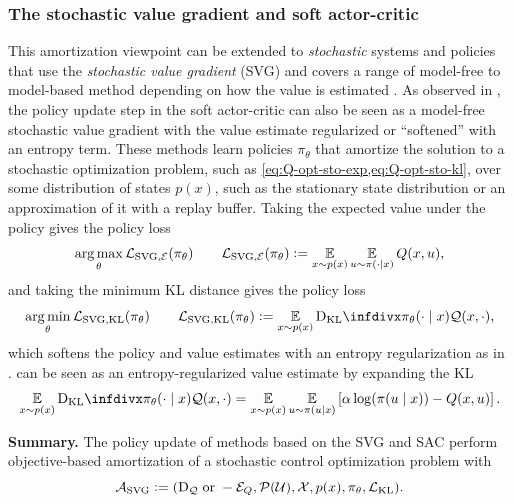 \documentclass[twoside,11pt]{article}
\begin{document}
\subsubsection{The stochastic value gradient and soft actor-critic}
This amortization viewpoint can be extended to \emph{stochastic} systems
and policies that use the \emph{stochastic value gradient} (SVG)
and covers a range of model-free to model-based method depending on
how the value is estimated
\citep{byravan2019imagined,hafner2019dream,byravan2021evaluating,amos2021model}.
As observed in
\citet{haarnoja2018soft,amos2021model},
the policy update step in the soft actor-critic
can also be seen as a model-free
stochastic value gradient with the value estimate
regularized or ``softened'' with an entropy term.
These methods learn policies $\pi_\theta$ that
amortize the solution to a stochastic optimization
problem, such as \cref{eq:Q-opt-sto-exp,eq:Q-opt-sto-kl},
over some distribution of states $p(x)$, such as the
stationary state distribution or an approximation of it
with a replay buffer.
Taking the expected value under the policy gives
the policy loss
\begin{equation}
  \operatorname*{arg\,max}_\theta {\mathcal{L}}_{\rm SVG,{\mathcal{E}}}(\pi_\theta) \qquad {\mathcal{L}}_{\rm SVG,{\mathcal{E}}}(\pi_\theta)\vcentcolon= \operatorname*{\mathbb{E}}_{x\sim p(x)} \operatorname*{\mathbb{E}}_{u\sim\pi(\cdot|x)} Q(x, u),
  \label{eq:svg-loss-exp}
\end{equation}
and taking the minimum KL distance gives the policy loss
\begin{equation}
  \argmin_\theta \gL_{\rm SVG,KL}(\pi_\theta) \qquad \gL_{\rm SVG,KL}(\pi_\theta)\defeq \E_{x\sim p(x)} \kl{\pi_\theta(\cdot\mid x)}{\gQ(x, \cdot)},
  \label{eq:svg-loss-kl}
\end{equation}
which softens the policy and value estimates with an entropy regularization
as in \citet{haarnoja2018soft,amos2021model}.
 can be seen as an entropy-regularized value
estimate by expanding the KL
\begin{equation}
  \E_{x\sim p(x)} \kl{\pi_\theta(\cdot\mid x)}{\gQ(x, \cdot)} =
  \E_{x\sim p(x)} \E_{u\sim \pi(u\mid x)} \left[ \alpha\log(\pi(u\mid x)) - Q(x, u) \right].
\end{equation}

\textbf{Summary.}
The policy update of methods based on the SVG and SAC perform
objective-based amortization of a stochastic control
optimization problem with
\begin{equation*}
{\mathcal{A}}_{\rm SVG}\vcentcolon= (\mathrm{D}_{\mathcal{Q}}\;\mathrm{or}\;-{\mathcal{E}}_Q, {\mathcal{P}}({\mathcal{U}}), {\mathcal{X}}, p(x), \pi_\theta, {\mathcal{L}}_{\rm KL}).
\end{equation*}
\end{document}

